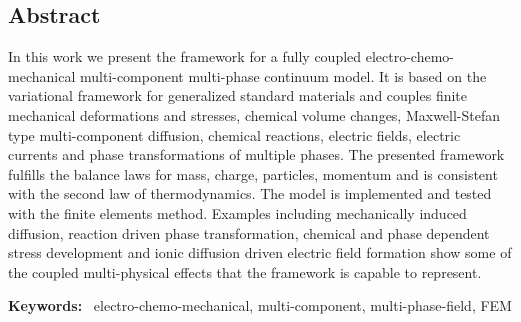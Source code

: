 \subsection*{Abstract}
In this work we present the framework for a fully coupled electro-chemo-mechanical multi-component multi-phase continuum model. It is based on the variational framework for generalized standard materials and couples finite mechanical deformations and stresses, chemical volume changes, Maxwell-Stefan type multi-component diffusion, chemical reactions, electric fields, electric currents and phase transformations of multiple phases. The presented framework fulfills the balance laws for mass, charge, particles, momentum and is consistent with the second law of thermodynamics. The model is implemented and tested with the finite elements method. Examples including mechanically induced diffusion, reaction driven phase transformation, chemical and phase dependent stress development and ionic diffusion driven electric field formation show some of the coupled multi-physical effects that the framework is capable to represent. 

\textbf{Keywords: }~electro-chemo-mechanical, multi-component, multi-phase-field, FEM

